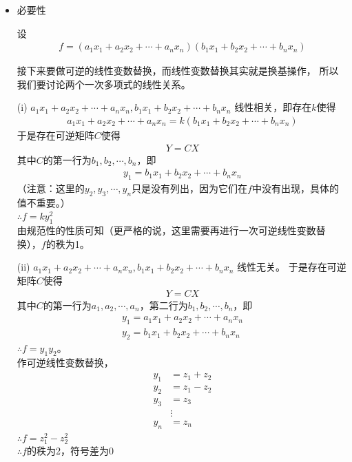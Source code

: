 \documentclass{article}
\begin{document}
\begin{itemize}
  \item 必要性

        设
        \begin{align*}
          f = (a_1 x_1 + a_2 x_2 + \cdots + a_n x_n) (b_1 x_1 + b_2 x_2 + \cdots + b_n x_n)
        \end{align*}

        接下来要做可逆的线性变数替换，而线性变数替换其实就是换基操作，
        所以我们要讨论两个一次多项式的线性关系。

        (i) $a_1 x_1 + a_2 x_2 + \cdots + a_n x_n, b_1 x_1 + b_2 x_2 + \cdots + b_n x_n$
        线性相关，即存在$k$使得
        \begin{align*}
          a_1 x_1 + a_2 x_2 + \cdots + a_n x_n = k(b_1 x_1 + b_2 x_2 + \cdots + b_n x_n)
        \end{align*}
        于是存在可逆矩阵$C$使得
        \begin{align*}
          Y = C X
        \end{align*}
        其中$C$的第一行为$b_1, b_2, \cdots, b_n$，即
        \begin{align*}
          y_1 = b_1 x_1 + b_2 x_2 + \cdots + b_n x_n
        \end{align*}
        （注意：这里的$y_2, y_3, \cdots, y_n$只是没有列出，因为它们在$f$中没有出现，具体的值不重要。）\\
        $\therefore f = k y_1^2$\\
        由规范性的性质可知（更严格的说，这里需要再进行一次可逆线性变数替换），$f$的秩为1。

        (ii) $a_1 x_1 + a_2 x_2 + \cdots + a_n x_n, b_1 x_1 + b_2 x_2 + \cdots + b_n x_n$
        线性无关。
        于是存在可逆矩阵$C$使得
        \begin{align*}
          Y = C X
        \end{align*}
        其中$C$的第一行为$a_1, a_2, \cdots, a_n$，第二行为$b_1, b_2, \cdots, b_n$，即
        \begin{align*}
          y_1 = a_1 x_1 + a_2 x_2 + \cdots + a_n x_n \\
          y_2 = b_1 x_1 + b_2 x_2 + \cdots + b_n x_n
        \end{align*}
        $\therefore f = y_1 y_2$。\\
        作可逆线性变数替换，
        \begin{align*}
          y_1 & = z_1 + z_2 \\
          y_2 & = z_1 - z_2 \\
          y_3 & = z_3       \\
              & \vdots      \\
          y_n & = z_n
        \end{align*}
        $\therefore f = z_1^2 - z_2^2$\\
        $\therefore f$的秩为2，符号差为0


\end{itemize}
\end{document}
